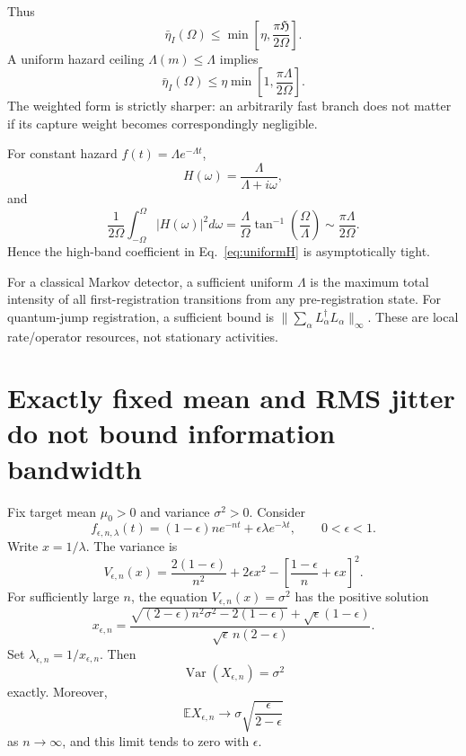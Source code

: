 \documentclass[aps,prapplied,preprint,nofootinbib]{revtex4-2}
\newcommand{\Hcap}{\mathfrak H}
\begin{document}
Thus
\begin{equation}
\boxed{
\bar\eta_I(\Omega)
\le\min\left[\eta,\frac{\pi\Hcap}{2\Omega}\right].}
\label{eq:Hbound}
\end{equation}
A uniform hazard ceiling $\Lambda(m)\le\Lambda$ implies
\begin{equation}
\bar\eta_I(\Omega)\le
\eta\min\left[1,\frac{\pi\Lambda}{2\Omega}\right].
\label{eq:uniformH}
\end{equation}
The weighted form is strictly sharper: an arbitrarily fast branch does not matter if its capture weight becomes correspondingly negligible.

For constant hazard $f(t)=\Lambda e^{-\Lambda t}$,
\begin{equation}
H(\omega)=\frac{\Lambda}{\Lambda+i\omega},
\end{equation}
and
\begin{equation}
\frac{1}{2\Omega}\int_{-\Omega}^{\Omega}|H(\omega)|^2d\omega
=\frac{\Lambda}{\Omega}\tan^{-1}\!\left(\frac{\Omega}{\Lambda}\right)
\sim\frac{\pi\Lambda}{2\Omega}.
\end{equation}
Hence the high-band coefficient in Eq.~\eqref{eq:uniformH} is asymptotically tight.

For a classical Markov detector, a sufficient uniform $\Lambda$ is the maximum total intensity of all first-registration transitions from any pre-registration state. For quantum-jump registration, a sufficient bound is $\|\sum_\alpha L_\alpha^\dagger L_\alpha\|_\infty$. These are local rate/operator resources, not stationary activities.

\section{Exactly fixed mean and RMS jitter do not bound information bandwidth}

Fix target mean $\mu_0>0$ and variance $\sigma^2>0$. Consider
\begin{equation}
f_{\epsilon,n,\lambda}(t)
=(1-\epsilon)ne^{-nt}
+\epsilon\lambda e^{-\lambda t},
\qquad 0<\epsilon<1.
\end{equation}
Write $x=1/\lambda$. The variance is
\begin{equation}
V_{\epsilon,n}(x)
=\frac{2(1-\epsilon)}{n^2}+2\epsilon x^2
-\left[\frac{1-\epsilon}{n}+\epsilon x\right]^2.
\end{equation}
For sufficiently large $n$, the equation $V_{\epsilon,n}(x)=\sigma^2$ has the positive solution
\begin{equation}
\boxed{
x_{\epsilon,n}
=\frac{
\sqrt{(2-\epsilon)n^2\sigma^2-2(1-\epsilon)}
+\sqrt\epsilon(1-\epsilon)
}{
\sqrt\epsilon\,n(2-\epsilon)
}.}
\label{eq:exactx}
\end{equation}
Set $\lambda_{\epsilon,n}=1/x_{\epsilon,n}$. Then
\begin{equation}
\operatorname{Var}(X_{\epsilon,n})=\sigma^2
\end{equation}
exactly. Moreover,
\begin{equation}
\mathbb E X_{\epsilon,n}\to
\sigma\sqrt{\frac{\epsilon}{2-\epsilon}}
\end{equation}
as $n\to\infty$, and this limit tends to zero with $\epsilon$.
\end{document}

